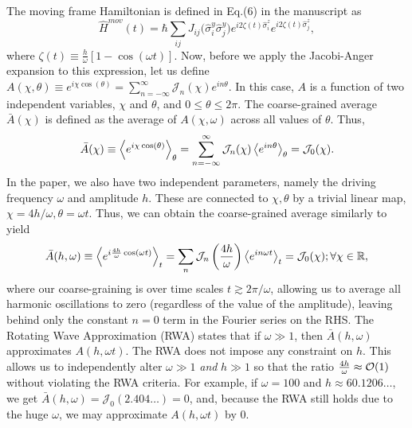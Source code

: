 \documentclass[aps,prb,reprint,showpacs,floatfix,superscriptaddress, onecolumn, nofootinbib, 9pt]{revtex4-2}
\begin{document}
\begin{enumerate}
{    The moving frame Hamiltonian is defined in Eq.(6) in the manuscript as
    \begin{equation}
        \hat{H}^{mov}(t) = \hbar\sum_{ij} J_{ij} \Big(\hat{\sigma}^y_i\hat{\sigma}^y_j\Big) e^{i 2\zeta(t)\hat{\sigma}^z_i}  e^{i 2\zeta(t) \hat{\sigma}^z_j},
        \label{eq:hmov}
    \end{equation}
    where $\zeta(t)\equiv \frac{h}{\omega}[1-\cos(\omega t)]$. Now, before we apply the Jacobi-Anger expansion to this expression, let us define $ A(\chi,\theta)\equiv\displaystyle e^{i\chi \cos(\theta)} = \sum_{n=-\infty}^{\infty} \mathcal{J}_n(\chi)e^{in\theta} $. In this case, $A$ is a function of two independent variables, $\chi$ and $\theta$, and $0\leq\theta\leq 2\pi$. The coarse-grained average $\bar{A}(\chi)$ is defined as the average of $A(\chi, \omega)$ across all values of $\theta$. Thus,
    \begin{equation}
    \bar{A}(\chi) \equiv \expval{e^{i\chi\cos(\theta)}}_{\theta} = \sum_{n=-\infty}^{\infty} \mathcal{J}_n(\chi) \expval{e^{in\theta}}_{\theta} =\mathcal{J}_0(\chi).
    \end{equation}
In the paper, we also have two independent parameters, namely the driving frequency $\omega$ and amplitude $h$. These are connected to $\chi, \theta$ by a trivial linear map, $\chi=4h/\omega, \theta=\omega t$. Thus, we can obtain the coarse-grained average similarly to yield
    \begin{equation}
        \bar{A}(h,\omega) \equiv \expval{e^{i\frac{4h}{\omega}\cos(\omega t)}}_t = \sum_n\mathcal{J}_n\left(\frac{4h}{\omega}\right)\expval{e^{i n \omega t}}_t = \mathcal{J}_0(\chi) ;  \forall{\chi}\in\mathbb{R},
        \label{eq:jacang}
    \end{equation}
where our coarse-graining is over time scales $t\gtrsim 2\pi/\omega$, allowing us to average all harmonic oscillations to zero (regardless of the value of the amplitude), leaving behind only the constant $n=0$ term in the Fourier series on the RHS. The Rotating Wave Approximation (RWA) states that if $\omega \gg 1$, then  $\bar{A}(h,\omega)$ approximates $A(h, \omega t)$. The RWA does not impose any constraint on $h$.
    This allows us to independently alter $\omega \gg 1$ \emph{and} $h \gg 1$ so that the ratio $\frac{4h}{\omega} \approx \order{1}$ without violating the RWA criteria. For example, if $\omega=100$ and $h\approx 60.1206\dots$, we get $\bar{A}(h,\omega)=\mathcal{J}_0(2.404\dots)=0$, and, because the RWA still holds due to the huge $\omega$, we may approximate $A(h,\omega t)$ by $0$.

}
\end{enumerate}
\end{document}
